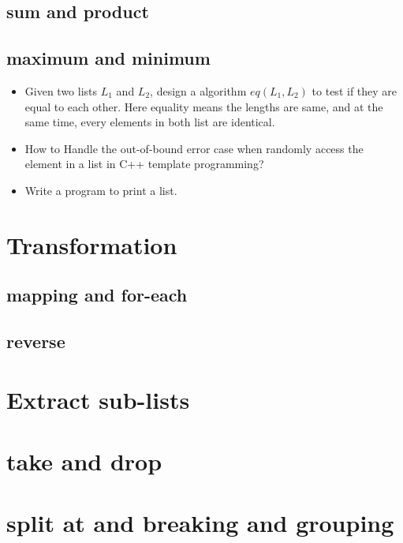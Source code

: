 \documentclass{article}
\begin{document}
\subsection{sum and product}

\subsection{maximum and minimum}

\begin{Exercise}
\begin{itemize}
\item Given two lists $L_1$ and $L_2$, design a algorithm $eq(L_1, L_2)$ to test if they are equal to each other.
Here equality means the lengths are same, and at the same time, every elements in both list are identical.
\item How to Handle the out-of-bound error case when randomly access the element in a list in C++ template programming?
\item Write a program to print a list.
\end{itemize}
\end{Exercise}

\section{Transformation}

\subsection{mapping and for-each}

\subsection{reverse}

\section{Extract sub-lists}

\section{take and drop}

\section{split at and breaking and grouping}
\end{document}
